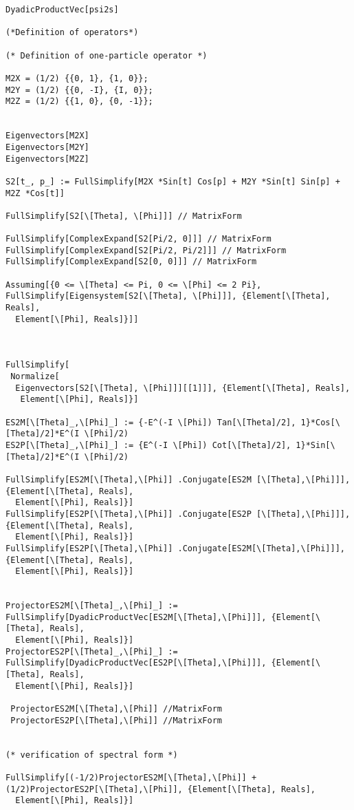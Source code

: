 \documentclass[%
  twocolumn,
 showpacs,
 showkeys,
 preprintnumbers,
 amsmath,amssymb,
 aps,
  pra,
  longbibliography,
 floatfix,
 ]{revtex4-1}
\begin{document}
{\begin{lstlisting}[backgroundcolor=\color{yellow!10},framerule=0pt,breaklines=true, frame=tb]
DyadicProductVec[psi2s]

(*Definition of operators*)

(* Definition of one-particle operator *)

M2X = (1/2) {{0, 1}, {1, 0}};
M2Y = (1/2) {{0, -I}, {I, 0}};
M2Z = (1/2) {{1, 0}, {0, -1}};


Eigenvectors[M2X]
Eigenvectors[M2Y]
Eigenvectors[M2Z]

S2[t_, p_] := FullSimplify[M2X *Sin[t] Cos[p] + M2Y *Sin[t] Sin[p] + M2Z *Cos[t]]

FullSimplify[S2[\[Theta], \[Phi]]] // MatrixForm

FullSimplify[ComplexExpand[S2[Pi/2, 0]]] // MatrixForm
FullSimplify[ComplexExpand[S2[Pi/2, Pi/2]]] // MatrixForm
FullSimplify[ComplexExpand[S2[0, 0]]] // MatrixForm

Assuming[{0 <= \[Theta] <= Pi, 0 <= \[Phi] <= 2 Pi}, FullSimplify[Eigensystem[S2[\[Theta], \[Phi]]], {Element[\[Theta], Reals],
  Element[\[Phi], Reals]}]]



FullSimplify[
 Normalize[
  Eigenvectors[S2[\[Theta], \[Phi]]][[1]]], {Element[\[Theta], Reals],
   Element[\[Phi], Reals]}]

ES2M[\[Theta]_,\[Phi]_] := {-E^(-I \[Phi]) Tan[\[Theta]/2], 1}*Cos[\[Theta]/2]*E^(I \[Phi]/2)
ES2P[\[Theta]_,\[Phi]_] := {E^(-I \[Phi]) Cot[\[Theta]/2], 1}*Sin[\[Theta]/2]*E^(I \[Phi]/2)

FullSimplify[ES2M[\[Theta],\[Phi]] .Conjugate[ES2M [\[Theta],\[Phi]]], {Element[\[Theta], Reals],
  Element[\[Phi], Reals]}]
FullSimplify[ES2P[\[Theta],\[Phi]] .Conjugate[ES2P [\[Theta],\[Phi]]], {Element[\[Theta], Reals],
  Element[\[Phi], Reals]}]
FullSimplify[ES2P[\[Theta],\[Phi]] .Conjugate[ES2M[\[Theta],\[Phi]]], {Element[\[Theta], Reals],
  Element[\[Phi], Reals]}]


ProjectorES2M[\[Theta]_,\[Phi]_] := FullSimplify[DyadicProductVec[ES2M[\[Theta],\[Phi]]], {Element[\[Theta], Reals],
  Element[\[Phi], Reals]}]
ProjectorES2P[\[Theta]_,\[Phi]_] := FullSimplify[DyadicProductVec[ES2P[\[Theta],\[Phi]]], {Element[\[Theta], Reals],
  Element[\[Phi], Reals]}]

 ProjectorES2M[\[Theta],\[Phi]] //MatrixForm
 ProjectorES2P[\[Theta],\[Phi]] //MatrixForm


(* verification of spectral form *)

FullSimplify[(-1/2)ProjectorES2M[\[Theta],\[Phi]] + (1/2)ProjectorES2P[\[Theta],\[Phi]], {Element[\[Theta], Reals],
  Element[\[Phi], Reals]}]



\end{lstlisting}}
\end{document}
